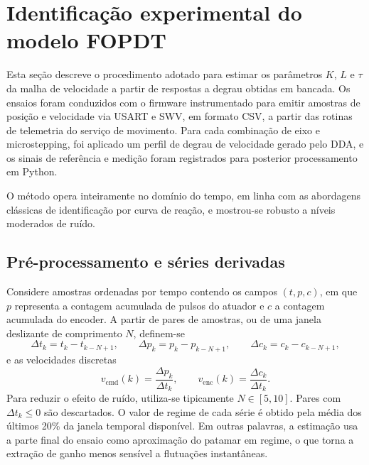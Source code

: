 \section{Identifica\c{c}\~ao experimental do modelo FOPDT}
\label{sec:identificacao_fopdt}

Esta se\c{c}\~ao descreve o procedimento adotado para estimar os
par\^ametros $K$, $L$ e $\tau$ da malha de velocidade a partir de
respostas a degrau obtidas em bancada. Os ensaios foram conduzidos com o
firmware instrumentado para emitir amostras de posi\c{c}\~ao e velocidade
via USART e SWV, em formato CSV, a partir das rotinas de telemetria do
servi\c{c}o de movimento. Para cada combina\c{c}\~ao de eixo e
microstepping, foi aplicado um perfil de degrau de velocidade gerado
pelo DDA, e os sinais de refer\^encia e medi\c{c}\~ao foram registrados
para posterior processamento em Python.

O m\'etodo opera inteiramente no dom\'inio do tempo, em linha com as
abordagens cl\'assicas de identifica\c{c}\~ao por curva de rea\c{c}\~ao, e
mostrou-se robusto a n\'iveis moderados de ru\'ido.

\subsection{Pr\'e-processamento e s\'eries derivadas}

Considere amostras ordenadas por tempo contendo os campos
$(t, p, c)$, em que $p$ representa a contagem acumulada de pulsos do
atuador e $c$ a contagem acumulada do encoder. A partir de pares de
amostras, ou de uma janela deslizante de comprimento $N$, definem-se
\begin{equation}
    \Delta t_k = t_k - t_{k-N+1},
    \qquad
    \Delta p_k = p_k - p_{k-N+1},
    \qquad
    \Delta c_k = c_k - c_{k-N+1},
\end{equation}
e as velocidades discretas
\begin{equation}
    v_{\text{cmd}}(k) = \frac{\Delta p_k}{\Delta t_k},
    \qquad
    v_{\text{enc}}(k) = \frac{\Delta c_k}{\Delta t_k}.
\end{equation}
Para reduzir o efeito de ru\'ido, utiliza-se tipicamente
$N \in [5,10]$. Pares com $\Delta t_k \le 0$ s\~ao descartados. O valor
de regime de cada s\'erie \'e obtido pela m\'edia dos \'ultimos 20\% da
janela temporal dispon\'ivel. Em outras palavras, a estima\c{c}\~ao usa a
parte final do ensaio como aproxima\c{c}\~ao do patamar em regime, o que
torna a extra\c{c}\~ao de ganho menos sens\'ivel a flutua\c{c}\~oes
instant\^aneas.

